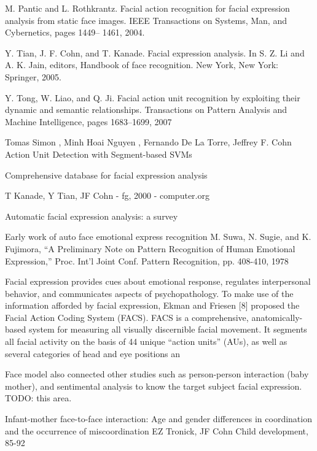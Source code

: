 M. Pantic and L. Rothkrantz. Facial action recognition for facial
expression analysis from static face images. IEEE Transactions
on Systems, Man, and Cybernetics, pages 1449–
1461, 2004.

 Y. Tian, J. F. Cohn, and T. Kanade. Facial expression analysis.
In S. Z. Li and A. K. Jain, editors, Handbook of face
recognition. New York, New York: Springer, 2005.

Y. Tong, W. Liao, and Q. Ji. Facial action unit recognition by
exploiting their dynamic and semantic relationships. Transactions
on Pattern Analysis and Machine Intelligence, pages
1683–1699, 2007

Tomas Simon
, Minh Hoai Nguyen
, Fernando De La Torre, Jeffrey F. Cohn 
Action Unit Detection with Segment-based SVMs


Comprehensive database for facial expression analysis

T Kanade, Y Tian, JF Cohn - fg, 2000 - computer.org


Automatic facial expression analysis: a survey


Early work of auto face emotional express recognition
M. Suwa, N. Sugie, and K. Fujimora, “A Preliminary Note on Pattern Recognition of Human Emotional Expression,” Proc. Int’l Joint Conf. Pattern Recognition, pp. 408-410, 1978








Facial expression provides cues about emotional response,
regulates interpersonal behavior, and communicates
aspects of psychopathology. To make use of the information
afforded by facial expression, Ekman and Friesen [8] proposed
the Facial Action Coding System (FACS). FACS is
a comprehensive, anatomically-based system for measuring
all visually discernible facial movement. It segments all facial
activity on the basis of 44 unique “action units” (AUs),
as well as several categories of head and eye positions an




Face model also connected other studies such as person-person interaction (baby mother), and sentimental analysis to know the target subject facial expression.  TODO: this area.

Infant-mother face-to-face interaction: Age and gender differences in coordination and the occurrence of miscoordination
EZ Tronick, JF Cohn
Child development, 85-92








